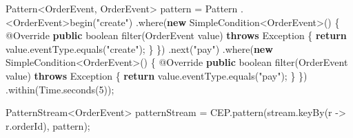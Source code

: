 \documentclass[cn,11pt,chinese]{elegantbook}
\newenvironment{Shaded}{}{}
\newcommand{\AttributeTok}[1]{\textcolor[rgb]{0.49,0.56,0.16}{#1}}
\newcommand{\BuiltInTok}[1]{#1}
\newcommand{\DataTypeTok}[1]{\textcolor[rgb]{0.56,0.13,0.00}{#1}}
\newcommand{\DecValTok}[1]{\textcolor[rgb]{0.25,0.63,0.44}{#1}}
\newcommand{\FunctionTok}[1]{\textcolor[rgb]{0.02,0.16,0.49}{#1}}
\newcommand{\KeywordTok}[1]{\textcolor[rgb]{0.00,0.44,0.13}{\textbf{#1}}}
\newcommand{\NormalTok}[1]{#1}
\newcommand{\StringTok}[1]{\textcolor[rgb]{0.25,0.44,0.63}{#1}}
\begin{document}
\begin{Shaded}
\begin{Highlighting}[]
        \BuiltInTok{Pattern}\NormalTok{\textless{}OrderEvent, OrderEvent\textgreater{} pattern = }\BuiltInTok{Pattern}
\NormalTok{            .\textless{}OrderEvent\textgreater{}}\FunctionTok{begin}\NormalTok{(}\StringTok{"create"}\NormalTok{)}
\NormalTok{            .}\FunctionTok{where}\NormalTok{(}\KeywordTok{new}\NormalTok{ SimpleCondition\textless{}OrderEvent\textgreater{}() \{}
                \AttributeTok{@Override}
                \KeywordTok{public} \DataTypeTok{boolean} \FunctionTok{filter}\NormalTok{(OrderEvent value) }\KeywordTok{throws} \BuiltInTok{Exception}\NormalTok{ \{}
                    \KeywordTok{return}\NormalTok{ value.}\FunctionTok{eventType}\NormalTok{.}\FunctionTok{equals}\NormalTok{(}\StringTok{"create"}\NormalTok{);}
\NormalTok{                \}}
\NormalTok{            \})}
\NormalTok{            .}\FunctionTok{next}\NormalTok{(}\StringTok{"pay"}\NormalTok{)}
\NormalTok{            .}\FunctionTok{where}\NormalTok{(}\KeywordTok{new}\NormalTok{ SimpleCondition\textless{}OrderEvent\textgreater{}() \{}
                \AttributeTok{@Override}
                \KeywordTok{public} \DataTypeTok{boolean} \FunctionTok{filter}\NormalTok{(OrderEvent value) }\KeywordTok{throws} \BuiltInTok{Exception}\NormalTok{ \{}
                    \KeywordTok{return}\NormalTok{ value.}\FunctionTok{eventType}\NormalTok{.}\FunctionTok{equals}\NormalTok{(}\StringTok{"pay"}\NormalTok{);}
\NormalTok{                \}}
\NormalTok{            \})}
\NormalTok{            .}\FunctionTok{within}\NormalTok{(}\BuiltInTok{Time}\NormalTok{.}\FunctionTok{seconds}\NormalTok{(}\DecValTok{5}\NormalTok{));}

\NormalTok{        PatternStream\textless{}OrderEvent\textgreater{} patternStream = CEP.}\FunctionTok{pattern}\NormalTok{(stream.}\FunctionTok{keyBy}\NormalTok{(r {-}\textgreater{} r.}\FunctionTok{orderId}\NormalTok{), pattern);}


\end{Highlighting}
\end{Shaded}
\end{document}
